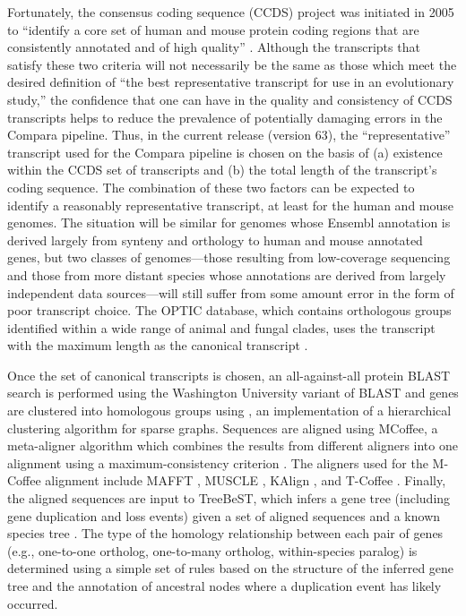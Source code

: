 Fortunately, the consensus coding sequence (CCDS) project was
initiated in 2005 to ``identify a core set of human and mouse protein
coding regions that are consistently annotated and of high quality''
\citep{Pruitt2009}. Although the transcripts that satisfy these two
criteria will not necessarily be the same as those which meet the
desired definition of ``the best representative transcript for use in
an evolutionary study,'' the confidence that one can have in the
quality and consistency of CCDS transcripts helps to reduce the
prevalence of potentially damaging errors in the Compara pipeline.
Thus, in the current release (version 63), the ``representative''
transcript used for the Compara pipeline is chosen on the basis of (a)
existence within the CCDS set of transcripts and (b) the total length
of the transcript's coding sequence. The combination of these two
factors can be expected to identify a reasonably representative
transcript, at least for the human and mouse genomes. The situation
will be similar for genomes whose Ensembl annotation is derived
largely from synteny and orthology to human and mouse annotated genes,
but two classes of genomes---those resulting from low-coverage
sequencing and those from more distant species whose annotations are
derived from largely independent data sources---will still suffer from
some amount error in the form of poor transcript choice. The OPTIC
database, which contains orthologous groups identified within a wide
range of animal and fungal clades, uses the transcript with the
maximum length as the canonical transcript \citep{Heger2008}.

Once the set of canonical transcripts is chosen, an all-against-all
protein BLAST search is performed using the Washington University
variant of BLAST and genes are clustered into homologous groups using
\hclust, an implementation of a hierarchical clustering algorithm for
sparse graphs. Sequences are aligned using MCoffee, a meta-aligner
algorithm which combines the results from different aligners into one
alignment using a maximum-consistency criterion
\citep{Wallace2006}. The aligners used for the M-Coffee alignment
include MAFFT \citep{Katoh2005}, MUSCLE \citep{Edgar2004}, KAlign
\citep{Lassmann2009}, and T-Coffee \citep{Notredame2000}. Finally, the
aligned sequences are input to TreeBeST, which infers a gene tree
(including gene duplication and loss events) given a set of aligned
sequences and a known species tree \citep{Ruan2008}. The type of the
homology relationship between each pair of genes (e.g., one-to-one
ortholog, one-to-many ortholog, within-species paralog) is determined
using a simple set of rules based on the structure of the inferred
gene tree and the annotation of ancestral nodes where a duplication
event has likely occurred.

